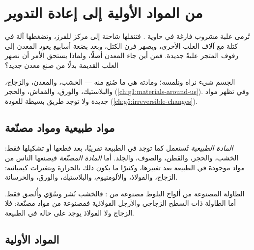 \chapter{من المواد الأولية إلى إعادة التدوير}\label{ch:g5:raw-materials-and-recycling}

تُرمى علبة مشروب فارغة في حاوية . فتنقلها شاحنة إلى مركز
للفرز، وتضغطها آلة في كتلة مع آلاف العلب الأخرى، ويصهر فرن الكتل، وبعد
بضعة أسابيع يعود المعدن إلى رفوف المتجر علبةً جديدة. فمن أين جاء المعدن
أصلًا، ولماذا يستحق الأمر أن نصهر العلب القديمة بدلًا من صنع معدن
جديد؟

\begin{recall}
الجسم شيء نراه ونلمسه؛ ومادته هي ما صُنع منه --- الخشب، والمعدن،
والزجاج، والبلاستيك، والورق، والقماش، والحجر
(\cref{ch:g1:materials-around-us}). وفي  تظهر مواد جديدة
ولا توجد طريق بسيطة للعودة (\cref{ch:g5:irreversible-changes}).
\end{recall}

\section{مواد طبيعية ومواد مصنّعة}

\begin{definition}\label{def:g5:raw-materials-and-recycling:natural-material}
\emph{المادة الطبيعية} تُستعمل كما توجد في الطبيعة
تقريبًا، بعد قطعها أو تشكيلها فقط: الخشب، والحجر، والقطن، والصوف،
والجلد. أما \emph{المادة المصنّعة} فيصنعها الناس من
مواد موجودة في الطبيعة بعد تغييرها، وكثيرًا ما يكون ذلك بالحرارة
وبتغيرات كيميائية: الزجاج، والفولاذ، والألومنيوم، والبلاستيك، والورق،
والخرسانة.
\end{definition}

\begin{example}[طاولتان]\label{ex:g5:raw-materials-and-recycling:tables}
الطاولة المصنوعة من ألواح البلوط مصنوعة من : فالخشب نُشر
وسُوّي وأُلصق فقط. أما الطاولة ذات السطح الزجاجي والأرجل الفولاذية
فمصنوعة من مواد مصنّعة: فلا الزجاج ولا الفولاذ يوجد على حاله في
الطبيعة.
\end{example}

\section{المواد الأولية}

